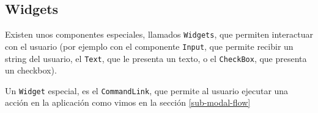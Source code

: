 \subsection{Widgets}
\label{sub-widget}

Existen unos componentes especiales, llamados \verb"Widgets"\cite{WDGTS}, que permiten interactuar con el usuario (por ejemplo con el componente \verb"Input", que permite recibir un string del usuario, el \verb"Text", que le presenta un texto, o el \verb"CheckBox", que presenta un checkbox).

Un \verb"Widget" especial, es el \verb"CommandLink", que permite al usuario ejecutar una acción en la aplicación como vimos en la sección \ref{sub-modal-flow}

%
%
%
%
%


